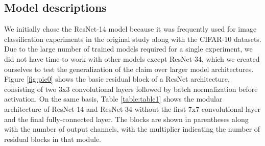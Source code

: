 \subsection{Model descriptions}
We initially chose the ResNet-14 model because it was frequently used for image classification experiments in the original study along with the CIFAR-10 datasets. Due to the large number of trained models required for a single experiment, we did not have time to work with other models except ResNet-34, which we created ourselves to test the generalization of the claim over larger model architectures. Figure \ref{fig:pic0} shows the basic residual block of a ResNet architecture, consisting of two 3x3 convolutional layers followed by batch normalization before activation. On the same basis, Table \ref{table:table1} shows the modular architecture of ResNet-14 and ResNet-34 \citep{he2016deep} without the first 7x7 convolutional layer and the final fully-connected layer. The blocks are shown in parentheses along with the number of output channels, with the multiplier indicating the number of residual blocks in that module. 
